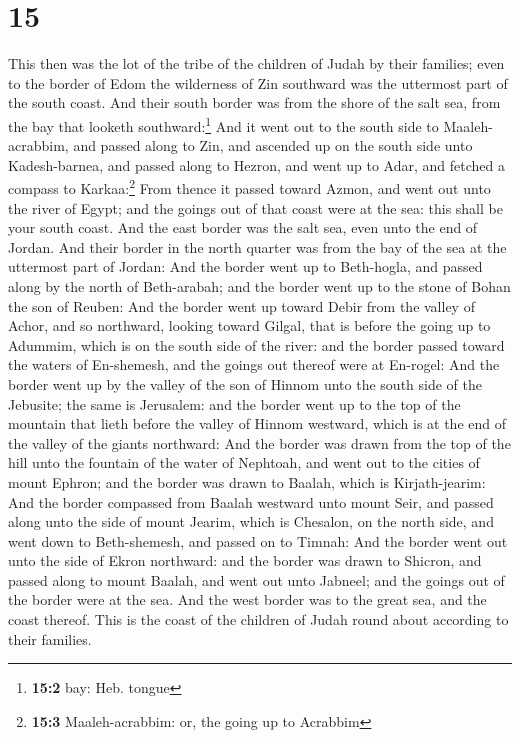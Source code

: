 \hypertarget{section-14}{%
\section{15}\label{section-14}}

 This then was the lot of the tribe of the children of
Judah by their families; even to the border of Edom the wilderness of
Zin southward was the uttermost part of the south coast. 
And their south border was from the shore of the salt sea, from the bay
that looketh southward:\footnote{\textbf{15:2} bay: Heb. tongue}
 And it went out to the south side to Maaleh-acrabbim, and
passed along to Zin, and ascended up on the south side unto
Kadesh-barnea, and passed along to Hezron, and went up to Adar, and
fetched a compass to Karkaa:\footnote{\textbf{15:3} Maaleh-acrabbim: or,
  the going up to Acrabbim}  From thence it passed toward
Azmon, and went out unto the river of Egypt; and the goings out of that
coast were at the sea: this shall be your south coast. 
And the east border was the salt sea, even unto the end of Jordan. And
their border in the north quarter was from the bay of the sea at the
uttermost part of Jordan:  And the border went up to
Beth-hogla, and passed along by the north of Beth-arabah; and the border
went up to the stone of Bohan the son of Reuben:  And the
border went up toward Debir from the valley of Achor, and so northward,
looking toward Gilgal, that is before the going up to Adummim, which is
on the south side of the river: and the border passed toward the waters
of En-shemesh, and the goings out thereof were at En-rogel:
 And the border went up by the valley of the son of Hinnom
unto the south side of the Jebusite; the same is Jerusalem: and the
border went up to the top of the mountain that lieth before the valley
of Hinnom westward, which is at the end of the valley of the giants
northward:  And the border was drawn from the top of the
hill unto the fountain of the water of Nephtoah, and went out to the
cities of mount Ephron; and the border was drawn to Baalah, which is
Kirjath-jearim:  And the border compassed from Baalah
westward unto mount Seir, and passed along unto the side of mount
Jearim, which is Chesalon, on the north side, and went down to
Beth-shemesh, and passed on to Timnah:  And the border
went out unto the side of Ekron northward: and the border was drawn to
Shicron, and passed along to mount Baalah, and went out unto Jabneel;
and the goings out of the border were at the sea.  And
the west border was to the great sea, and the coast thereof. This is the
coast of the children of Judah round about according to their families.

